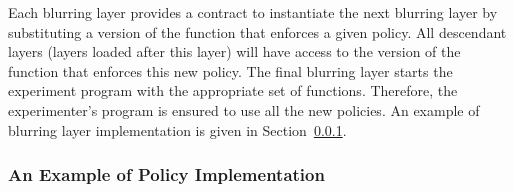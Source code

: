 Each blurring layer provides a contract to instantiate the 
next blurring layer by substituting a version of the function that 
enforces a given policy. All descendant layers (layers loaded 
after this layer) will have access to the version of the function 
that enforces this new policy. The final blurring layer starts the 
experiment program with the appropriate set of functions. 
%
%
Therefore, the experimenter's program is ensured to use all the 
new policies. An example of blurring layer implementation is given in 
Section~\ref{sec-precision-example}.  

\subsubsection{An Example of Policy Implementation}
\label{sec-precision-example}

